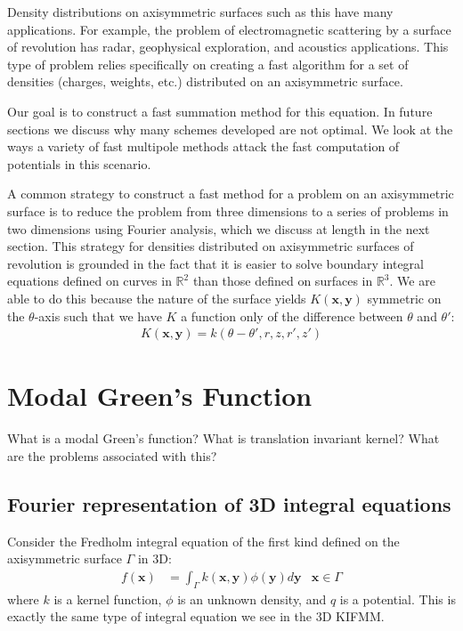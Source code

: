 \documentclass[11pt, oneside]{article}   	%
\begin{document}
Density distributions on axisymmetric surfaces such as this have many applications. For example, the problem of electromagnetic scattering by a surface of revolution has radar, geophysical exploration, and acoustics applications. This type of problem relies specifically on creating a fast algorithm for a set of densities (charges, weights, etc.) distributed on an axisymmetric surface.

Our goal is to construct a fast summation method for this equation. In future sections we discuss why many schemes developed are not optimal. We look at the ways a variety of fast multipole methods attack the fast computation of potentials in this scenario.

A common strategy to construct a fast method for a problem on an axisymmetric surface is to reduce the problem from three dimensions to a series of problems in two dimensions using Fourier analysis, which we discuss at length in the next section. This strategy for densities distributed on axisymmetric surfaces of revolution is grounded in the fact that it is easier to solve boundary integral equations defined on curves in $\mathbb{R}^2$ than those defined on surfaces in $\mathbb{R}^3$. We are able to do this because the nature of the surface yields $K(\mathbf{x},\mathbf{y})$ symmetric on the $\theta$-axis such that we have $K$ a function only of the difference between $\theta$ and $\theta'$:
\begin{align}
K(\mathbf{x},\mathbf{y})=k(\theta-\theta',r,z,r',z')
\end{align}


\section{Modal Green's Function}
What is a modal Green's function? What is translation invariant kernel? What are the problems associated with this?


\subsection{Fourier representation of 3D integral equations}

Consider the Fredholm integral equation of the first kind defined on the axisymmetric surface $\Gamma$ in 3D:
\begin{align}
f(\mathbf{x}) &= \int_\Gamma k(\mathbf{x},\mathbf{y})\phi(\mathbf{y})d\mathbf{y} &\mathbf{x}\in\Gamma
\end{align}
where $k$ is a kernel function, $\phi$ is an unknown density, and $q$ is a potential. This is exactly the same type of integral equation we see in the 3D KIFMM.
\end{document}
